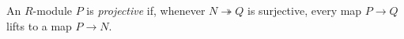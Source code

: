 
An $R$-module $P$ is \emph{projective} if, whenever $N\twoheadrightarrow Q$ is surjective, every map $P\to Q$ lifts to a map $P\to N$.
